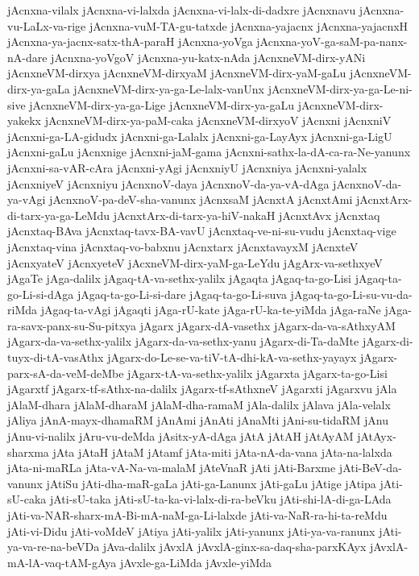 {jAcnxna-vilalx
jAcnxna-vi-lalxda
jAcnxna-vi-lalx-di-dadxre
jAcnxnavu
jAcnxna-vu-LaLx-va-rige
jAcnxna-vuM-TA-gu-tatxde
jAcnxna-yajacnx
jAcnxna-yajacnxH
jAcnxna-ya-jacnx-satx-thA-paraH
jAcnxna-yoVga
jAcnxna-yoV-ga-saM-pa-nanx-nA-dare
jAcnxna-yoVgoV
jAcnxna-yu-katx-nAda
jAcnxneVM-dirx-yANi
jAcnxneVM-dirxya
jAcnxneVM-dirxyaM
jAcnxneVM-dirx-yaM-gaLu
jAcnxneVM-dirx-ya-gaLa
jAcnxneVM-dirx-ya-ga-Le-lalx-vanUnx
jAcnxneVM-dirx-ya-ga-Le-ni-sive
jAcnxneVM-dirx-ya-ga-Lige
jAcnxneVM-dirx-ya-gaLu
jAcnxneVM-dirx-yakekx
jAcnxneVM-dirx-ya-paM-caka
jAcnxneVM-dirxyoV
jAcnxni
jAcnxniV
jAcnxni-ga-LA-gidudx
jAcnxni-ga-Lalalx
jAcnxni-ga-LayAyx
jAcnxni-ga-LigU
jAcnxni-gaLu
jAcnxnige
jAcnxni-jaM-gama
jAcnxni-sathx-la-dA-ca-ra-Ne-yanunx
jAcnxni-sa-vAR-cAra
jAcnxni-yAgi
jAcnxniyU
jAcnxniya
jAcnxni-yalalx
jAcnxniyeV
jAcnxniyu
jAcnxnoV-daya
jAcnxnoV-da-ya-vA-dAga
jAcnxnoV-da-ya-vAgi
jAcnxnoV-pa-deV-sha-vanunx
jAcnxsaM
jAcnxtA
jAcnxtAmi
jAcnxtArx-di-tarx-ya-ga-LeMdu
jAcnxtArx-di-tarx-ya-hiV-nakaH
jAcnxtAvx
jAcnxtaq
jAcnxtaq-BAva
jAcnxtaq-tavx-BA-vavU
jAcnxtaq-ve-ni-su-vudu
jAcnxtaq-vige
jAcnxtaq-vina
jAcnxtaq-vo-babxnu
jAcnxtarx
jAcnxtavayxM
jAcnxteV
jAcnxyateV
jAcnxyeteV
jAcxneVM-dirx-yaM-ga-LeYdu
jAgArx-va-sethxyeV
jAgaTe
jAga-dalilx
jAgaq-tA-va-sethx-yalilx
jAgaqta
jAgaq-ta-go-Lisi
jAgaq-ta-go-Li-si-dAga
jAgaq-ta-go-Li-si-dare
jAgaq-ta-go-Li-suva
jAgaq-ta-go-Li-su-vu-da-riMda
jAgaq-ta-vAgi
jAgaqti
jAga-rU-kate
jAga-rU-ka-te-yiMda
jAga-raNe
jAga-ra-savx-panx-su-Su-pitxya
jAgarx
jAgarx-dA-vasethx
jAgarx-da-va-sAthxyAM
jAgarx-da-va-sethx-yalilx
jAgarx-da-va-sethx-yanu
jAgarx-di-Ta-daMte
jAgarx-di-tuyx-di-tA-vasAthx
jAgarx-do-Le-se-va-tiV-tA-dhi-kA-va-sethx-yayayx
jAgarx-parx-sA-da-veM-deMbe
jAgarx-tA-va-sethx-yalilx
jAgarxta
jAgarx-ta-go-Lisi
jAgarxtf
jAgarx-tf-sAthx-na-dalilx
jAgarx-tf-sAthxneV
jAgarxti
jAgarxvu
jAla
jAlaM-dhara
jAlaM-dharaM
jAlaM-dha-ramaM
jAla-dalilx
jAlava
jAla-velalx
jAliya
jAnA-mayx-dhamaRM
jAnAmi
jAnAti
jAnaMti
jAni-su-tidaRM
jAnu
jAnu-vi-nalilx
jAru-vu-deMda
jAsitx-yA-dAga
jAtA
jAtAH
jAtAyAM
jAtAyx-sharxma
jAta
jAtaH
jAtaM
jAtamf
jAta-miti
jAta-nA-da-vana
jAta-na-lalxda
jAta-ni-maRLa
jAta-vA-Na-va-malaM
jAteVnaR
jAti
jAti-Barxme
jAti-BeV-da-vanunx
jAtiSu
jAti-dha-maR-gaLa
jAti-ga-Lanunx
jAti-gaLu
jAtige
jAtipa
jAti-sU-caka
jAti-sU-taka
jAti-sU-ta-ka-vi-lalx-di-ra-beVku
jAti-shi-lA-di-ga-LAda
jAti-va-NAR-sharx-mA-Bi-mA-naM-ga-Li-lalxde
jAti-va-NaR-ra-hi-ta-reMdu
jAti-vi-Didu
jAti-voMdeV
jAtiya
jAti-yalilx
jAti-yanunx
jAti-ya-va-ranunx
jAti-ya-va-re-na-beVDa
jAva-dalilx
jAvxlA
jAvxlA-ginx-sa-daq-sha-parxKAyx
jAvxlA-mA-lA-vaq-tAM-gAya
jAvxle-ga-LiMda
jAvxle-yiMda
}
